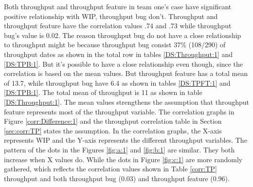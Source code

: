 \documentclass[UKenglish]{ifimaster}  %
\begin{document}
Both throughput and throughput feature in team one's case have significant positive relationship with WIP, throughput bug don't. Throughput and throughput feature have the correlation values .74 and .73 while throughput bug's value is 0.02. The reason throughput bug do not have a close relationship to throughput might be because throughput bug consist 37\% (108/290) of throughput dates as shown in the total row in tables \ref{DS:Throughput:1} and \ref{DS:TPB:1}. But it's possible to have a close relationship even though, since the correlation is based on the mean values. But throughput feature has a total mean of 13.7, while throughput bug have 6.4 as shown in tables \ref{DS:TPFT:1} and \ref{DS:TPB:1}. The total mean of throughput is 11 as shown in table \ref{DS:Throughput:1}. The mean values strengthens the assumption that throughput feature represents most of the throughput variable. The correlation  graphs in Figure \ref{corr:Difference:1}  and the throughput correlation table in Section \ref{sec:corr:TP} states the assumption. In the correlation graphs, the X-axis represents WIP and the Y-axis represents the different throughput variables. The pattern of the dots in the Figures \ref{fig:a:1} and \ref{fig:b:1} are similar. They both increase when X values do.  While the dots in Figure \ref{fig:c:1} are more randomly gathered, which reflects the correlation values shown in Table \ref{corr:TP} throughput and both throughput bug (0.03) and throughput feature (0.96).
\end{document}
